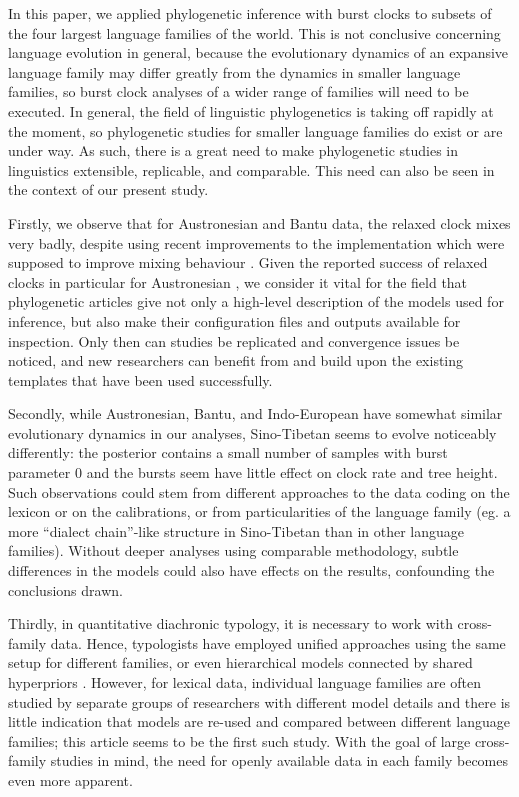 \documentclass[]{rsos}%
\begin{document}
In this paper, we applied phylogenetic inference with burst clocks to subsets of the four largest language families of the world. This is not conclusive concerning language evolution in general, because the evolutionary dynamics of an expansive language family may differ greatly from the dynamics in smaller language families, so burst clock analyses of a wider range of families will need to be executed.
In general, the field of linguistic phylogenetics is taking off rapidly at the moment, so phylogenetic studies for smaller language families do exist or are under way.
As such, there is a great need to make phylogenetic studies in linguistics
extensible, replicable, and comparable. This need can also be seen in the context of
our present study.

Firstly, we observe that for
Austronesian and Bantu data, the relaxed clock mixes very badly, despite using
recent improvements to the implementation which were supposed to improve mixing
behaviour \parencite{orc}. Given the reported success
of relaxed clocks in particular for Austronesian \parencite{gray2009language},
we consider it vital for the
field that phylogenetic articles give not only a high-level description of the
models used for inference, but also make their configuration files and outputs
available for inspection.
Only then can studies be replicated and convergence issues be noticed, and
new researchers can benefit from and build upon the existing templates that
have been used successfully.

Secondly, while Austronesian, Bantu, and
Indo-European have somewhat similar evolutionary dynamics in our analyses, Sino-Tibetan
seems to evolve noticeably differently: the posterior contains a small number of samples with burst parameter $0$ and the bursts seem have little effect on clock rate and tree height. Such observations could stem from different approaches to the data coding on the lexicon or on the calibrations, or from particularities of the language family (eg. a more “dialect chain”-like structure in Sino-Tibetan than in other language families).
Without deeper analyses using comparable methodology, subtle
differences in the models could also have effects on the results, confounding the conclusions drawn.

Thirdly, in quantitative diachronic typology, it is necessary to work with cross-family
data. Hence, typologists have employed unified approaches using the same setup for different families, or even hierarchical models connected by shared hyperpriors \parencite{dunn2011evolved,jager2021phylogenetic}. However, for lexical
data, individual language families are often studied by separate groups of
researchers with different model details and there is little indication that
models are re-used and compared between different language families; this article seems to be the first such study. With the goal of large cross-family studies in mind, the need for openly available data in each family becomes even more apparent.
\end{document}
